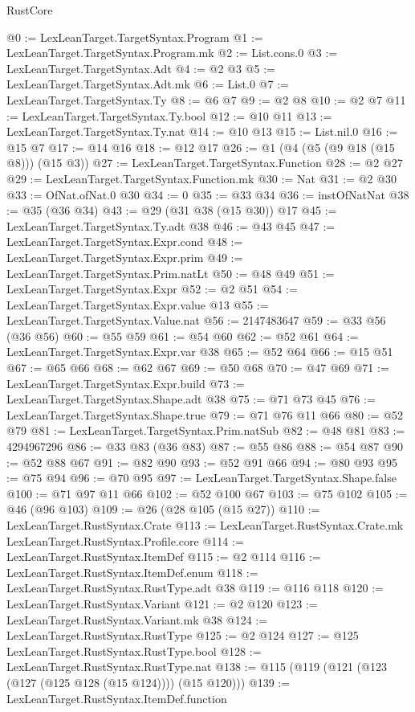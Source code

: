 \begin{lexlean}{RustCore}
\begin{coremodule}
@0 := LexLeanTarget.TargetSyntax.Program
@1 := LexLeanTarget.TargetSyntax.Program.mk
@2 := List.cons.{0}
@3 := LexLeanTarget.TargetSyntax.Adt
@4 := @2 @3
@5 := LexLeanTarget.TargetSyntax.Adt.mk
@6 := List.{0}
@7 := LexLeanTarget.TargetSyntax.Ty
@8 := @6 @7
@9 := @2 @8
@10 := @2 @7
@11 := LexLeanTarget.TargetSyntax.Ty.bool
@12 := @10 @11
@13 := LexLeanTarget.TargetSyntax.Ty.nat
@14 := @10 @13
@15 := List.nil.{0}
@16 := @15 @7
@17 := @14 @16
@18 := @12 @17
@26 := @1 (@4 (@5 (@9 @18 (@15 @8))) (@15 @3))
@27 := LexLeanTarget.TargetSyntax.Function
@28 := @2 @27
@29 := LexLeanTarget.TargetSyntax.Function.mk
@30 := Nat
@31 := @2 @30
@33 := OfNat.ofNat.{0} @30
@34 := 0
@35 := @33 @34
@36 := instOfNatNat
@38 := @35 (@36 @34)
@43 := @29 (@31 @38 (@15 @30)) @17
@45 := LexLeanTarget.TargetSyntax.Ty.adt @38
@46 := @43 @45
@47 := LexLeanTarget.TargetSyntax.Expr.cond
@48 := LexLeanTarget.TargetSyntax.Expr.prim
@49 := LexLeanTarget.TargetSyntax.Prim.natLt
@50 := @48 @49
@51 := LexLeanTarget.TargetSyntax.Expr
@52 := @2 @51
@54 := LexLeanTarget.TargetSyntax.Expr.value @13
@55 := LexLeanTarget.TargetSyntax.Value.nat
@56 := 2147483647
@59 := @33 @56 (@36 @56)
@60 := @55 @59
@61 := @54 @60
@62 := @52 @61
@64 := LexLeanTarget.TargetSyntax.Expr.var @38
@65 := @52 @64
@66 := @15 @51
@67 := @65 @66
@68 := @62 @67
@69 := @50 @68
@70 := @47 @69
@71 := LexLeanTarget.TargetSyntax.Expr.build
@73 := LexLeanTarget.TargetSyntax.Shape.adt @38
@75 := @71 @73 @45
@76 := LexLeanTarget.TargetSyntax.Shape.true
@79 := @71 @76 @11 @66
@80 := @52 @79
@81 := LexLeanTarget.TargetSyntax.Prim.natSub
@82 := @48 @81
@83 := 4294967296
@86 := @33 @83 (@36 @83)
@87 := @55 @86
@88 := @54 @87
@90 := @52 @88 @67
@91 := @82 @90
@93 := @52 @91 @66
@94 := @80 @93
@95 := @75 @94
@96 := @70 @95
@97 := LexLeanTarget.TargetSyntax.Shape.false
@100 := @71 @97 @11 @66
@102 := @52 @100 @67
@103 := @75 @102
@105 := @46 (@96 @103)
@109 := @26 (@28 @105 (@15 @27))
@110 := LexLeanTarget.RustSyntax.Crate
@113 := LexLeanTarget.RustSyntax.Crate.mk LexLeanTarget.RustSyntax.Profile.core
@114 := LexLeanTarget.RustSyntax.ItemDef
@115 := @2 @114
@116 := LexLeanTarget.RustSyntax.ItemDef.enum
@118 := LexLeanTarget.RustSyntax.RustType.adt @38
@119 := @116 @118
@120 := LexLeanTarget.RustSyntax.Variant
@121 := @2 @120
@123 := LexLeanTarget.RustSyntax.Variant.mk @38
@124 := LexLeanTarget.RustSyntax.RustType
@125 := @2 @124
@127 := @125 LexLeanTarget.RustSyntax.RustType.bool
@128 := LexLeanTarget.RustSyntax.RustType.nat
@138 := @115 (@119 (@121 (@123 (@127 (@125 @128 (@15 @124)))) (@15 @120)))
@139 := LexLeanTarget.RustSyntax.ItemDef.function

\end{coremodule}
\end{lexlean}

